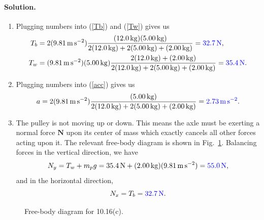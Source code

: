 \documentclass[11pt]{article}
\newcommand{\refeq}[1]{(\ref{#1})}
\newcommand{\beq}{\begin{equation*}}
\newcommand{\eeq}{\end{equation*}}
\newenvironment{solution}
{
    \paragraph{Solution.}
    \ignorespaces
}
{
    \bigskip
}
\renewcommand{\vec}[1]{\mathbf{#1}}
\begin{document}
\begin{solution}
	\begin{enumerate}
		\item Plugging numbers into \refeq{Tb} and \refeq{Tw} gives us
			\begin{align*}
				\Tb &= 2 (\sig) \frac{(\simb) (\simw)}{2 (\simb) + 2 (\simw) + (\simp)} = {\color{blue} \SI{32.7}{\newton}}, \\
				\Tw &= (\sig) (\simw) \frac{2 (\simb) + (\simp)}{2 (\simb) + 2 (\simw) + (\simp)} = {\color{blue} \SI{35.4}{\newton}}.
			\end{align*}
		
		\item Plugging numbers into \refeq{acc} gives us
			\beq
				a = 2 (\sig) \frac{(\simw)}{2 (\simb) + 2 (\simw) + (\simp)} = {\color{blue} \SI{2.73}{\meter\per\square\second}}.
			\eeq
			
		\item The pulley is not moving up or down.  This means the axle must be exerting a normal force $\vec{N}$ upon its center of mass which exactly cancels all other forces acting upon it.  The relevant free-body diagram is shown in Fig.~\ref{E10.16c}.  Balancing forces in the vertical direction, we have
		\beq
			\Ny = \Tw + \mmp g = \SI{35.4}{\newton} + (\simp) (\sig) = {\color{blue} \SI{55.0}{\newton}},
		\eeq
		and in the horizontal direction,
		\beq
			\Nx = \Tb = {\color{blue} \SI{32.7}{\newton}}.
		\eeq
	\end{enumerate}
\end{solution}

\begin{figure}[b]
	\caption{Free-body diagram for 10.16(c).}
	\label{E10.16c}
\end{figure}
\end{document}
